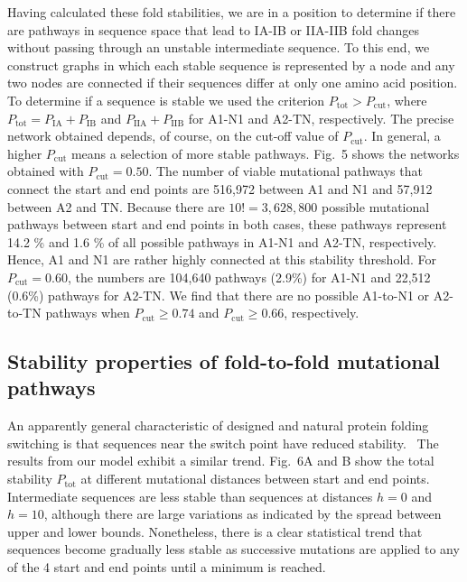 \documentclass[
aip,
rsi,%
amsmath,amssymb,
reprint,%
]{revtex4-1}
\newcommand {\Pcut}     	{{P_\mathrm{cut}}}
\newcommand {\Ptot}	{{P_\mathrm{tot}}}
\newcommand {\PIA}    	{{P_\mathrm{IA}}}
\newcommand {\PIB}    	{{P_\mathrm{IB}}}
\newcommand {\PIIA}    	{{P_\mathrm{IIA}}}
\newcommand {\PIIB}    	{{P_\mathrm{IIB}}}
\begin{document}
Having calculated these fold stabilities, we are in a position to determine if there are pathways in sequence space that lead to IA-IB or IIA-IIB fold changes without passing through an unstable intermediate sequence. To this end, we construct graphs in which each stable sequence is represented by a node and any two nodes are connected if their sequences differ at only one amino acid position. To determine if a sequence is stable we used the criterion $P_\mathrm{tot}>\Pcut$, where  $\Ptot = \PIA + \PIB$ and $\PIIA + \PIIB$ for A1-N1 and A2-TN, respectively. The precise network obtained depends, of course, on the cut-off value of $\Pcut$. In general, a higher $\Pcut$ means a selection of more stable pathways. Fig.~5 shows the networks obtained with $\Pcut=0.50$. The number of viable mutational pathways that connect the start and end points are 516,972 between A1 and N1 and  57,912 between A2 and TN. Because there are $10! =3,628,800$ possible mutational pathways between start and end points in both cases, these pathways represent 14.2 \% and 1.6 \% of all possible pathways in A1-N1 and A2-TN, respectively. Hence, A1 and N1 are rather highly connected at this stability threshold. For $\Pcut=0.60$, the numbers are 104,640 pathways (2.9\%) for A1-N1 and 22,512 (0.6\%) pathways for A2-TN. We find that there are no possible A1-to-N1 or A2-to-TN pathways when $\Pcut\ge0.74$ and $\Pcut\ge 0.66$, respectively. \\

\subsection{Stability properties of fold-to-fold mutational pathways}
\noindent 
An apparently general characteristic of designed and natural protein folding switching is that sequences near the switch point have reduced stability.~\cite{Bryan2010} The results from our model exhibit a similar trend. Fig.~6A and B show the total stability $\Ptot$ at different mutational distances between start and end points. Intermediate sequences are less stable than sequences at distances $h=0$ and $h=10$, although there are large variations as indicated by the spread between upper and lower bounds. Nonetheless, there is a clear statistical trend that sequences become gradually less stable as successive mutations are applied to any of the 4 start and end points until a minimum is reached. 
\end{document}
